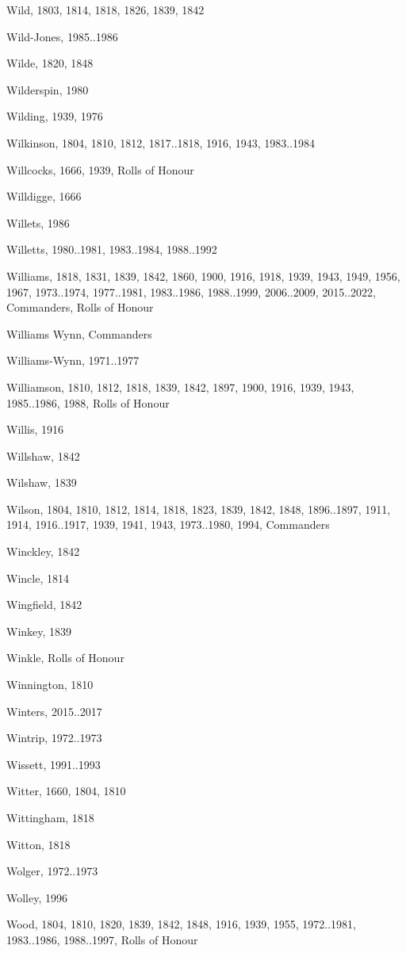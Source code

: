 \begin{theindex}
\item Wild, 1803, 1814, 1818, 1826, 1839, 1842
\item Wild-Jones, 1985..1986
\item Wilde, 1820, 1848
\item Wilderspin, 1980
\item Wilding, 1939, 1976
\item Wilkinson, 1804, 1810, 1812, 1817..1818, 1916, 1943, 1983..1984
\item Willcocks, 1666, 1939, Rolls of Honour
\item Willdigge, 1666
\item Willets, 1986
\item Willetts, 1980..1981, 1983..1984, 1988..1992
\item Williams, 1818, 1831, 1839, 1842, 1860, 1900, 1916, 1918, 1939, 1943, 1949, 1956, 1967, 1973..1974, 1977..1981, 1983..1986, 1988..1999, 2006..2009, 2015..2022, Commanders, Rolls of Honour
\item Williams Wynn, Commanders
\item Williams-Wynn, 1971..1977
\item Williamson, 1810, 1812, 1818, 1839, 1842, 1897, 1900, 1916, 1939, 1943, 1985..1986, 1988, Rolls of Honour
\item Willis, 1916
\item Willshaw, 1842
\item Wilshaw, 1839
\item Wilson, 1804, 1810, 1812, 1814, 1818, 1823, 1839, 1842, 1848, 1896..1897, 1911, 1914, 1916..1917, 1939, 1941, 1943, 1973..1980, 1994, Commanders
\item Winckley, 1842
\item Wincle, 1814
\item Wingfield, 1842
\item Winkey, 1839
\item Winkle, Rolls of Honour
\item Winnington, 1810
\item Winters, 2015..2017
\item Wintrip, 1972..1973
\item Wissett, 1991..1993
\item Witter, 1660, 1804, 1810
\item Wittingham, 1818
\item Witton, 1818
\item Wolger, 1972..1973
\item Wolley, 1996
\item Wood, 1804, 1810, 1820, 1839, 1842, 1848, 1916, 1939, 1955, 1972..1981, 1983..1986, 1988..1997, Rolls of Honour

\end{theindex}
